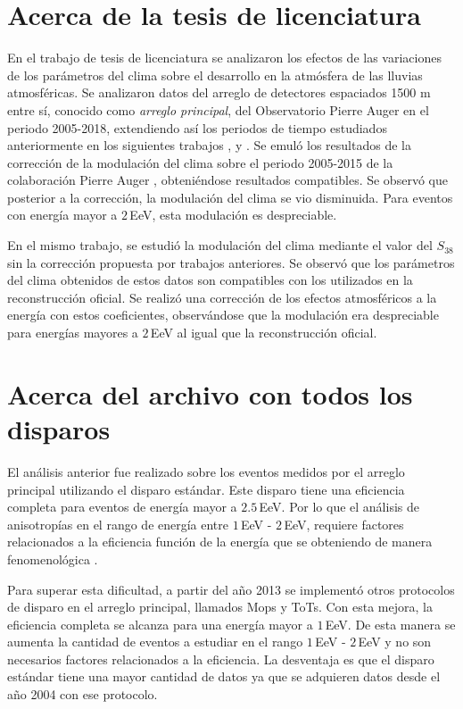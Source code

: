 \section{Acerca de la tesis de licenciatura}

En el trabajo de tesis de licenciatura se analizaron los efectos de las variaciones de los parámetros del clima sobre el desarrollo en la atmósfera de las lluvias atmosféricas. Se analizaron datos del arreglo de detectores espaciados 1500 m entre sí, conocido como \emph{arreglo principal}, del Observatorio Pierre Auger en el periodo 2005-2018,  extendiendo  así los periodos de tiempo estudiados anteriormente en los siguientes trabajos \cite{abraham2009atmospheric}, \cite{abreu2012description}   y \cite{aab2017impact} . Se emuló los resultados de la corrección de la modulación del clima sobre el periodo 2005-2015 de la colaboración Pierre Auger \cite{aab2017impact}, obteniéndose resultados compatibles. Se observó que posterior a la corrección, la modulación del clima se vio disminuida. Para eventos con energía mayor a $2\,$EeV, esta modulación es despreciable.

En el mismo trabajo, se estudió la modulación del clima mediante el valor del $S_{38}$ sin la corrección propuesta por trabajos anteriores. Se observó que los parámetros del clima obtenidos de estos datos son compatibles con los utilizados en la reconstrucción oficial. Se realizó una corrección de los efectos atmosféricos a la energía con estos coeficientes, observándose que la modulación era despreciable para energías mayores a $2\,$EeV al igual que la reconstrucción oficial. 

\section{Acerca del archivo con todos los disparos}

El análisis anterior fue realizado sobre los eventos medidos por el arreglo principal utilizando el disparo estándar. Este disparo tiene una eficiencia completa para eventos de energía mayor a $2.5\,$EeV. Por lo que el análisis de anisotropías en el rango de energía entre $1\,$EeV - $2\,$EeV, requiere factores relacionados a la eficiencia función de la energía que se obteniendo de manera fenomenológica \cite{taborda}.

Para superar esta dificultad,  a partir del año 2013 se implementó otros protocolos de disparo en el arreglo principal, llamados Mops y ToTs. Con esta mejora, la eficiencia completa se alcanza para una energía mayor a $1\,$EeV. De esta manera se aumenta la cantidad de eventos a estudiar en el rango $1\,$EeV - $2\,$EeV y no son necesarios factores relacionados a la eficiencia. La desventaja es que el disparo estándar tiene una mayor cantidad de datos ya que se adquieren datos  desde el año 2004 con ese protocolo.

